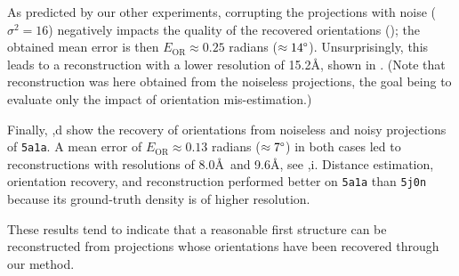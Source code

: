 As predicted by our other experiments, corrupting the projections with noise ($\sigma^2=16$) negatively impacts the quality of the recovered orientations (); the obtained mean error is then $E_\text{OR} \approx 0.25$ radians ($\approx 14\degree$).
Unsurprisingly, this leads to a reconstruction with a lower resolution of 15.2\AA, shown in .
(Note that reconstruction was here obtained from the noiseless projections, the goal being to evaluate only the impact of orientation mis-estimation.)

Finally, ,d show the recovery of orientations from noiseless and noisy projections of \texttt{5a1a}.
A mean error of $E_\text{OR} \approx 0.13$ radians ($\approx 7\degree$) in both cases led to reconstructions with resolutions of 8.0\AA\ and 9.6\AA, see ,i.
Distance estimation, orientation recovery, and reconstruction performed better on \texttt{5a1a} than \texttt{5j0n} because its ground-truth density is of higher resolution.


These results tend to indicate that a reasonable first structure can be reconstructed from projections whose orientations have been recovered through our method.

